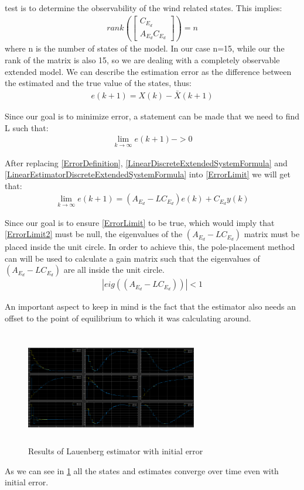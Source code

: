 \documentclass[conference]{IEEEtran}
\begin{document}
test is to determine the observability of the wind related states. This
implies:
\begin{align}
    rank(\begin{bmatrix}
             C_{E_d} \\
             A_{E_d}C_{E_d}
         \end{bmatrix})=n
\end{align}
where n is the number of states of the model.
In our case n=15, while our the rank of the matrix is also 15, so we are dealing with a completely observable extended model.
We can describe the estimation error as the difference between the estimated and the true value of the states, thus:
\begin{align}
    {e}(k+1)={X}(k)-\bar{X}(k+1)
    \label{ErrorDefinition}
\end{align}
\par
Since our goal is to minimize error, a statement can be made that we need to
find L such that:
\begin{align}
    \lim_{k \to \infty}  {e}(k+1)->0
    \label{ErrorLimit}
\end{align}
\par
After replacing {\ref{ErrorDefinition}},
{\ref{LinearDiscreteExtendedSystemFormula}} and
    {\ref{LinearEstimatorDiscreteExtendedSystemFormula}} into {\ref{ErrorLimit}} we
will get that:
\begin{align}
    \lim_{k \to \infty}  {e}(k+1)=(A_{E_d}-LC_{E_d}){e}(k)+C_{E_d}y(k)
    \label{ErrorLimit2}
\end{align}
\par
Since our goal is to ensure {\ref{ErrorLimit}} to be true, which would imply that {\ref{ErrorLimit2}} must
be null, the eigenvalues of the $(A_{E_d}-LC_{E_d})$ matrix 
must be placed inside the unit circle. In order to achieve
this, the pole-placement method can will be used to calculate a gain
matrix such that the eigenvalues of $(A_{E_d}-LC_{E_d})$ are all inside the
unit circle.
\begin{align}
    |eig((A_{E_d}-LC_{E_d}))|<1
    \label{EigenValuesEstimatorLauenBerg}
\end{align}
\par
An important aspect to keep in mind is the fact that the estimator also needs
an offset to the point of equilibrium to which it was calculating around.
\begin{figure} [h]
    \includegraphics[width=75mm,height=50mm]{SIMULINK2.PNG}
    \caption{Results of Lauenberg estimator with initial error}\label{fig:SIMULINK2}
\end{figure}
As we can see in {\ref{fig:SIMULINK2}} all the states and estimates converge over time even with initial error.
\end{document}
